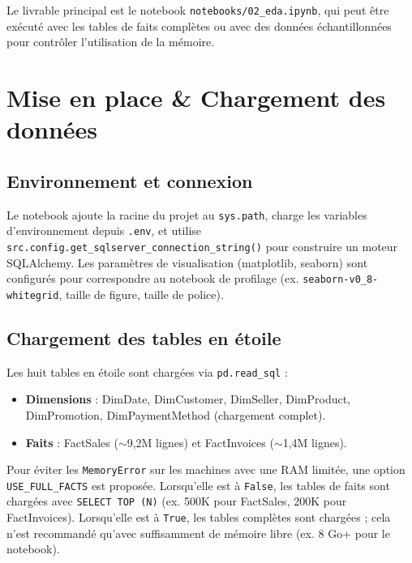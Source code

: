 \documentclass[11pt,a4paper]{article}
\begin{document}
Le livrable principal est le notebook \texttt{notebooks/02\_eda.ipynb}, qui peut être exécuté avec les tables de faits complètes ou avec des données échantillonnées pour contrôler l'utilisation de la mémoire.

\section{Mise en place \& Chargement des données}

\subsection{Environnement et connexion}

Le notebook ajoute la racine du projet au \texttt{sys.path}, charge les variables d'environnement depuis \texttt{.env}, et utilise \texttt{src.config.get\_sqlserver\_connection\_string()} pour construire un moteur SQLAlchemy. Les paramètres de visualisation (matplotlib, seaborn) sont configurés pour correspondre au notebook de profilage (ex. \texttt{seaborn-v0\_8-whitegrid}, taille de figure, taille de police).

\subsection{Chargement des tables en étoile}

Les huit tables en étoile sont chargées via \texttt{pd.read\_sql} :
\begin{itemize}[noitemsep]
  \item \textbf{Dimensions} : DimDate, DimCustomer, DimSeller, DimProduct, DimPromotion, DimPaymentMethod (chargement complet).
  \item \textbf{Faits} : FactSales ($\sim$9,2M lignes) et FactInvoices ($\sim$1,4M lignes).
\end{itemize}

Pour éviter les \texttt{MemoryError} sur les machines avec une RAM limitée, une option \texttt{USE\_FULL\_FACTS} est proposée. Lorsqu'elle est à \texttt{False}, les tables de faits sont chargées avec \texttt{SELECT TOP (N)} (ex. 500K pour FactSales, 200K pour FactInvoices). Lorsqu'elle est à \texttt{True}, les tables complètes sont chargées ; cela n'est recommandé qu'avec suffisamment de mémoire libre (ex. 8 Go+ pour le notebook).
\end{document}
